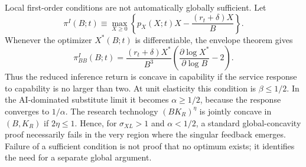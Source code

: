 Local first-order conditions are not automatically globally sufficient. Let
\[
 \pi^I(B;t)\equiv
 \max_{X\geq0}
 \left\{p_X(X;t)X-\frac{(r_t+\delta)X}{B}\right\}.
\]
Whenever the optimizer $X^*(B;t)$ is differentiable, the envelope theorem gives
\begin{equation}
 \pi^I_{BB}(B;t)
 =\frac{(r_t+\delta)X^*}{B^3}
 \left(\frac{\partial\log X^*}{\partial\log B}-2\right).
 \label{eq:inference-curvature}
\end{equation}
Thus the reduced inference return is concave in capability if the service response to capability is no larger than two. At unit elasticity this condition is $\beta\leq1/2$. In the AI-dominated substitute limit it becomes $\alpha\geq1/2$, because the response converges to $1/\alpha$. The research technology $(BK_R)^\eta$ is jointly concave in $(B,K_R)$ if $2\eta\leq1$. Hence, for $\sigma_{XL}>1$ and $\alpha<1/2$, a standard global-concavity proof necessarily fails in the very region where the singular feedback emerges. Failure of a sufficient condition is not proof that no optimum exists; it identifies the need for a separate global argument.
